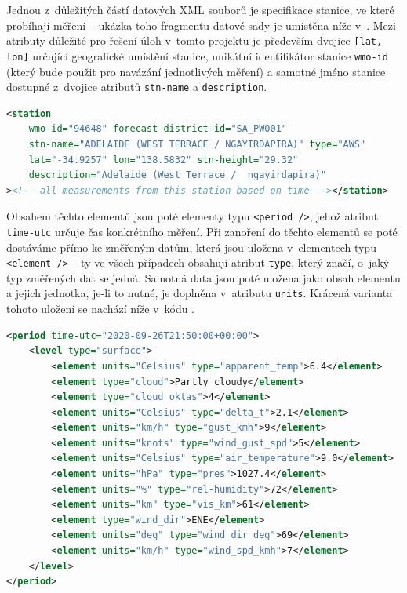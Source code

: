 \documentclass[10pt,a4paper,titlepage]{extarticle}
\begin{document}
    Jednou z~důležitých částí datových XML souborů je specifikace stanice, ve které probíhají měření -- ukázka toho
    fragmentu datové sady je umístěna níže v~. Mezi atributy důležité pro řešení úloh
    v~tomto projektu je především dvojice \mbox{\texttt{[lat, lon]}} určující geografické umístění stanice, unikátní
    identifikátor stanice \texttt{wmo-id} (který bude použit pro navázání jednotlivých měření) a samotné jméno stanice
    dostupné z~dvojice atributů \texttt{stn-name} a \texttt{description}.

    \begin{lstlisting}[language=XML,caption={Ukázka způsobu uložení informací týkajících se konkrétní stanice.},
    label=lst:station-example]
<station
    wmo-id="94648" forecast-district-id="SA_PW001"
    stn-name="ADELAIDE (WEST TERRACE / NGAYIRDAPIRA)" type="AWS"
    lat="-34.9257" lon="138.5832" stn-height="29.32"
    description="Adelaide (West Terrace /  ngayirdapira)"
><!-- all measurements from this station based on time --></station>
    \end{lstlisting}
    Obsahem těchto elementů jsou poté elementy typu \texttt{<period />}, jehož atribut \texttt{time-utc} určuje čas
    konkrétního měření. Při zanoření do těchto elementů se poté dostáváme přímo ke změřeným datům, která jsou uložena
    v~elementech typu \texttt{<element />} -- ty ve všech případech obsahují atribut \texttt{type}, který značí, o~jaký typ
    změřených dat se jedná. Samotná data jsou poté uložena jako obsah elementu a jejich jednotka, je-li to nutné, je
    doplněna v~atributu \texttt{units}. Krácená varianta tohoto uložení se nachází níže v~kódu
    .
    \begin{lstlisting}[language=XML,caption={Ukázka uložení meteorologických dat změřených v~\textit{21:50:00 UTC 26.9
    .2020}}, label=lst:measurement-example]
<period time-utc="2020-09-26T21:50:00+00:00">
    <level type="surface">
        <element units="Celsius" type="apparent_temp">6.4</element>
        <element type="cloud">Partly cloudy</element>
        <element type="cloud_oktas">4</element>
        <element units="Celsius" type="delta_t">2.1</element>
        <element units="km/h" type="gust_kmh">9</element>
        <element units="knots" type="wind_gust_spd">5</element>
        <element units="Celsius" type="air_temperature">9.0</element>
        <element units="hPa" type="pres">1027.4</element>
        <element units="%" type="rel-humidity">72</element>
        <element units="km" type="vis_km">61</element>
        <element type="wind_dir">ENE</element>
        <element units="deg" type="wind_dir_deg">69</element>
        <element units="km/h" type="wind_spd_kmh">7</element>
    </level>
</period>
    \end{lstlisting}%
\end{document}
